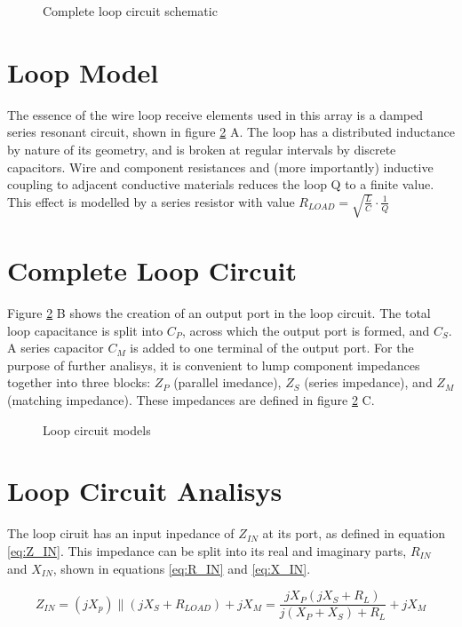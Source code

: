 \begin{figure}
    \centering
    
    \caption{Complete loop circuit schematic}
    \label{fig:loop_schematic}
\end{figure}

\section{Loop Model}
The essence of the wire loop receive elements used in this array is a damped series resonant circuit, shown in figure
\ref{fig:loop_model} A. The loop has a distributed inductance by nature of its geometry, and is broken at regular
intervals by discrete capacitors.  Wire and component resistances and (more importantly) inductive coupling to adjacent
conductive materials reduces the loop Q to a finite value. This effect is modelled by a series resistor with value
$R_{LOAD}=\sqrt{\frac{L}{C}}\cdot\frac{1}{Q}$

\section{Complete Loop Circuit}
Figure \ref{fig:loop_model} B shows the creation of an output port in the loop circuit. The total loop capacitance is split into $C_P$, 
across which the output port is formed, and $C_S$. A series capacitor $C_M$ is added to one terminal of the output port.
For the purpose of further analisys, it is convenient to lump component impedances together into three blocks: $Z_P$ (parallel
imedance), $Z_S$ (series impedance), and $Z_M$ (matching impedance). These impedances are defined in figure \ref{fig:loop_model} C.

\begin{figure}
    \centering
    
    \caption{Loop circuit models}
    \label{fig:loop_model}
\end{figure}

\section{Loop Circuit Analisys}
The loop ciruit has an input inpedance of $Z_{IN}$ at its port, as defined in equation \ref{eq:Z_IN}. This impedance can
be split into its real and imaginary parts, $R_{IN}$ and $X_{IN}$, shown in equations \ref{eq:R_IN} and \ref{eq:X_IN}.

\begin{equation} \label{eq:Z_IN}
    Z_{IN}=(jX_p)\parallel(jX_S+R_{LOAD})+jX_M = \frac{j X_P (j X_S + R_L)}{j (X_P + X_S) + R_L} + j X_M
\end{equation}

